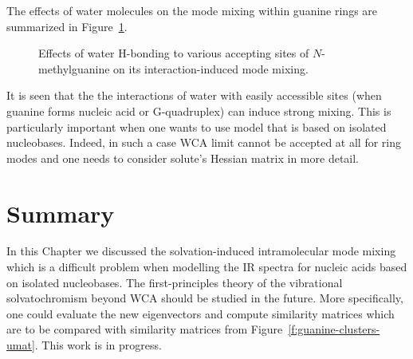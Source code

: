 \documentclass[a4paper,titlepage,twoside,fleqn,12pt]{book}
\begin{document}
The effects of water molecules on the mode mixing
within guanine rings are summarized in Figure~\ref{f:guanine-clusters-summary}.
%
\begin{figure}[t!]
\centering
\setlength\fboxsep{0.4pt}
\setlength\fboxrule{0.5pt}
\caption{
Effects of water H-bonding to various accepting sites
of $N$-methylguanine on its interaction\hyp{}induced mode mixing.
\label{f:guanine-clusters-summary}}
\end{figure}
%
It is seen that the the interactions of water with easily accessible sites (when guanine
forms nucleic acid or G-quadruplex) can induce strong mixing.
This is particularly important when one wants to use model that
is based on isolated nucleobases. Indeed, in such a case WCA
limit cannot be accepted at all for ring modes and one needs to consider
solute's Hessian matrix in more detail.

\section{Summary}

In this Chapter we discussed the solvation\hyp{}induced
intramolecular mode mixing which is a difficult problem
when modelling the IR spectra for nucleic acids based on
isolated nucleobases. The first\hyp{}principles theory
of the vibrational solvatochromism beyond WCA should be studied
in the future. More specifically, one could evaluate
the new eigenvectors and compute similarity matrices
which are to be compared with similarity matrices from
Figure~\ref{f:guanine-clusters-umat}. This work is in progress.
\end{document}

